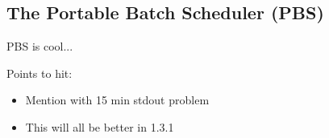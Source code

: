 %
%
%

\subsection{The Portable Batch Scheduler (PBS)}
\label{app:pbs-overview}

PBS is cool...

Points to hit:

\begin{itemize}
\item Mention with 15 min stdout problem
\item This will all be better in 1.3.1
\end{itemize}
